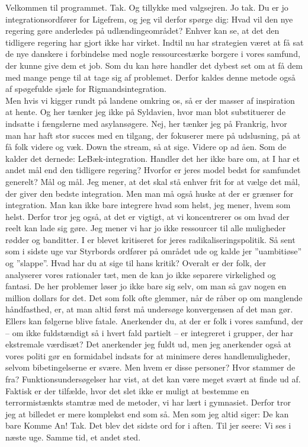 \documentclass[a4paper,11pt]{article}
\begin{document}
\begin{sketch}
 Velkommen til programmet.
 Tak.
 Og tillykke med valgsejren.
 Jo tak.
 Du er jo integrationsordfører for Ligefrem, og jeg vil derfor spørge dig: Hvad vil den nye regering gøre anderledes på udlændingeområdet?
 Enhver kan se, at det den tidligere regering har gjort ikke har virket. Indtil nu har strategien været at få sat de nye danskere i forbindelse med nogle ressourcestærke borgere i vores samfund, der kunne give dem et job. Som du kan høre handler det dybest set om at få dem med mange penge til at tage sig af problemet. Derfor kaldes denne metode også af spøgefulde sjæle for Rigmandsintegration. \\
\noindent Men hvis vi kigger rundt på landene omkring os, så er der masser af inspiration at hente. Og her tænker jeg ikke på Syldavien, hvor man blot substituerer de indsatte i fængslerne med asylansøgere. Nej, her tænker jeg på Frankrig, hvor man har haft stor succes med en tilgang, der fokuserer mere på udslusning, på at få folk videre og væk. Down the stream, så at sige. Videre op ad åen. Som de kalder det dernede: LeBæk-integration.
 Handler det her ikke bare om, at I har et andet mål end den tidligere regering? Hvorfor er jeres model bedst for samfundet generelt?
 Mål og mål. Jeg mener, at det skal stå enhver frit for at vælge det mål, der giver den bedste integration.  Men man må også huske at der er grænser for integration. Man kan ikke bare integrere hvad som helst, jeg mener, hvem som helst. Derfor tror jeg også, at det er vigtigt, at vi koncentrerer os om hvad der reelt kan lade sig gøre. Jeg mener vi har jo ikke ressourcer til alle muligheder rødder og banditter.
 I er blevet kritiseret for jeres radikaliseringspolitik. Så sent som i sidste uge var Styrbords ordfører på området ude og kalde jer ”uambitiøse” og ”slappe”. Hvad har du at sige til hans kritik?
 Overalt er der folk, der analyserer vores rationaler tæt, men de kan jo ikke separere virkelighed og fantasi. De her problemer løser jo ikke bare sig selv, om man så gav nogen en million dollars for det. Det som folk ofte glemmer, når de råber op om manglende håndfasthed, er, at man altid først må undersøge konvergensen af det man gør. Ellers kan følgerne blive fatale.
 Anerkender du, at der er folk i vores samfund, der – om ikke fuldstændigt så i hvert fald partielt – er integreret i grupper, der har ekstremale værdisæt?
 Det anerkender jeg fuldt ud, men jeg anerkender også at vores politi gør en formidabel indsats for at minimere deres handlemuligheder, selvom bibetingelserne er svære.
 Men hvem er disse personer? Hvor stammer de fra?
 Funktionsundersøgelser har vist, at det kan være meget svært at finde ud af. Faktisk er der tilfælde, hvor det slet ikke er muligt at bestemme en terrormistænkts stamtræ med de metoder, vi har lært i gymnasiet. Derfor tror jeg at billedet er mere komplekst end som så. Men som jeg altid siger: De kan bare Komme An!
 Tak. Det blev det sidste ord for i aften. Til jer seere: Vi ses i næste uge. Samme tid, et andet sted.

\end{sketch}
\end{document}
